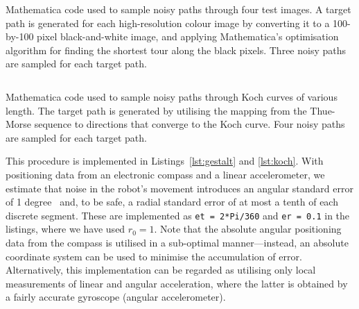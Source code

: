         \begin{listing}[pbt]
            \inputminted{mathematica}{Code/gestalt.m}
            \caption{Mathematica code used to sample noisy paths through four test images. A target path is generated for each high-resolution colour image by converting it to a 100-by-100 pixel black-and-white image, and applying Mathematica's optimisation algorithm for finding the shortest tour along the black pixels. Three noisy paths are sampled for each target path.}
            \label{lst:gestalt}
        \end{listing}

        \begin{listing}[pbt]
            \inputminted{mathematica}{Code/koch.m}
            \caption{Mathematica code used to sample noisy paths through Koch curves of various length. The target path is generated by utilising the mapping from the Thue-Morse sequence to directions that converge to the Koch curve. Four noisy paths are sampled for each target path.}
            \label{lst:koch}
        \end{listing}

        This procedure is implemented in Listings~\ref{lst:gestalt} and \ref{lst:koch}.
        With positioning data from an electronic compass and a linear accelerometer, we estimate that noise in the robot's movement introduces an angular standard error of 1 degree~\cite{honeywell} and, to be safe, a radial standard error of at most a tenth of each discrete segment.
        These are implemented as \texttt{et = 2*Pi/360} and \texttt{er = 0.1} in the listings, where we have used $r_0 = 1$.
        Note that the absolute angular positioning data from the compass is utilised in a sub-optimal manner---instead, an absolute coordinate system can be used to minimise the accumulation of error.
        Alternatively, this implementation can be regarded as utilising only local measurements of linear and angular acceleration, where the latter is obtained by a fairly accurate gyroscope (angular accelerometer).

